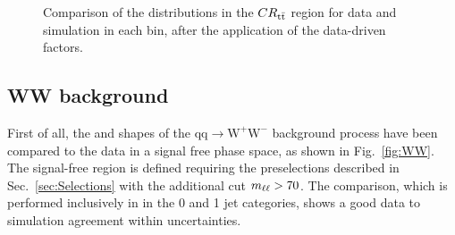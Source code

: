 \begin{figure}[htb]
\caption{Comparison of the \mll distributions in the $CR_{\mathrm{t}\bar{\mathrm{t}}}$ region for data and simulation in each \pth bin, after the application of the data-driven factors.\label{fig:mllCtrlDD}}
\end{figure}






\subsection{WW background \label{sec:WWBackground}}

First of all, the \mll and \mt shapes of the $\mathrm{qq\to W^{+}W^{-}}$ background process have been compared to the data in a signal free phase space, as shown in Fig.~\ref{fig:WW}. The signal-free region is defined requiring the preselections described in Sec.~\ref{sec:Selections} with the additional cut $m_{\ell\ell}>70$\GeV. The comparison, which is performed inclusively in \pth in the 0 and 1 jet categories, shows a good data to simulation agreement within uncertainties.

